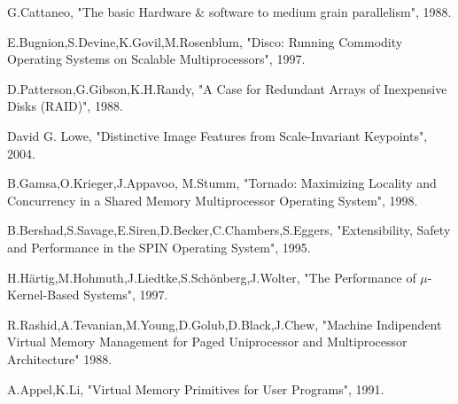 {\RaggedRight
\begin{thebibliography}{9}
\addtolength{\leftmargin}{0.2in}
\setlength{\itemindent}{0.2in}

   G.Cattaneo, "The basic Hardware \& software to medium grain parallelism", 1988.
  
   E.Bugnion,S.Devine,K.Govil,M.Rosenblum, "Disco: Running Commodity Operating Systems on Scalable Multiprocessors", 1997.
  
   D.Patterson,G.Gibson,K.H.Randy, "A Case for Redundant Arrays of Inexpensive Disks (RAID)", 1988.
  
   David G. Lowe, "Distinctive Image Features from Scale-Invariant Keypoints", 2004.
  
   B.Gamsa,O.Krieger,J.Appavoo, M.Stumm, "Tornado: Maximizing Locality and Concurrency in a Shared Memory Multiprocessor Operating System", 1998.
  
   B.Bershad,S.Savage,E.Siren,D.Becker,C.Chambers,S.Eggers, "Extensibility, Safety and Performance in the SPIN Operating System", 1995.
  
  H.H\"{a}rtig,M.Hohmuth,J.Liedtke,S.Sch\"{o}nberg,J.Wolter, "The Performance of $\mu$-Kernel-Based Systems", 1997.
  
   R.Rashid,A.Tevanian,M.Young,D.Golub,D.Black,J.Chew, "Machine Indipendent Virtual Memory Management for Paged Uniprocessor and Multiprocessor Architecture" 1988.
  
   A.Appel,K.Li, "Virtual Memory Primitives for User Programs", 1991.
  

\end{thebibliography}}
